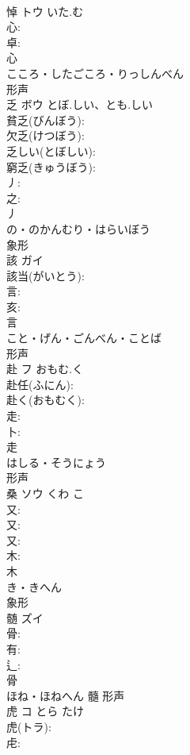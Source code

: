 \documentclass[8pt]{extreport}
\begin{document}
\begin{CJK}{UTF8}{min}
\\	悼	トウ	いた.む		
\\	心: 
\\	卓: 
\\	心	
\\	こころ・したごころ・りっしんべん	
\\	形声 
\\	乏	ボウ	とぼ.しい、とも.しい		
\\	貧乏(びんぼう): 
\\	欠乏(けつぼう): 
\\	乏しい(とぼしい): 
\\	窮乏(きゅうぼう): 
\\	丿: 
\\	之: 
\\	丿	
\\	の・のかんむり・はらいぼう	
\\	象形 
\\	該	ガイ			
\\	該当(がいとう): 
\\	言: 
\\	亥: 
\\	言	
\\	こと・げん・ごんべん・ことば	
\\	形声 
\\	赴	フ	おもむ.く		
\\	赴任(ふにん): 
\\	赴く(おもむく): 
\\	走: 
\\	卜: 
\\	走	
\\	はしる・そうにょう	
\\	形声 
\\	桑	ソウ	くわ	こ	
\\	又: 
\\	又: 
\\	又: 
\\	木: 
\\	木	
\\	き・きへん	
\\	象形 
\\	髄	ズイ			
\\	骨: 
\\	有: 
\\	辶: 
\\	骨	
\\	ほね・ほねへん	髓	形声 
\\	虎	コ	とら	たけ	
\\	虎(トラ): 
\\	虍: 

\end{CJK}
\end{document}
